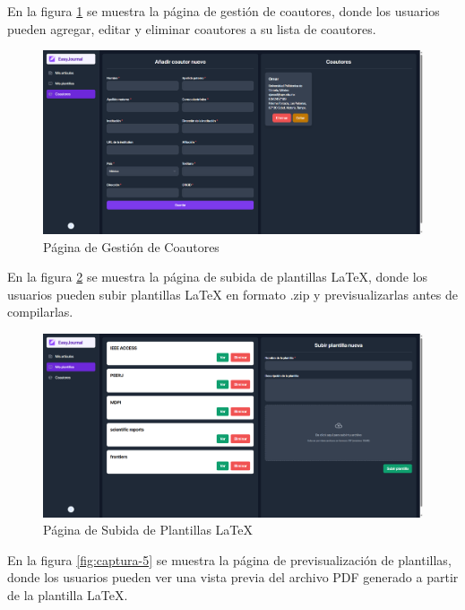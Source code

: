 En la figura \ref{fig:captura-3} se muestra la página de gestión de coautores, donde los usuarios pueden agregar, editar y eliminar coautores a su lista de coautores.

\begin{figure}[H]
    \centering
    \includegraphics[width=1\textwidth]{IMAGENES/captura-3.png}
    \caption{Página de Gestión de Coautores}
    \label{fig:captura-3}
\end{figure}

En la figura \ref{fig:captura-4} se muestra la página de subida de plantillas LaTeX, donde los usuarios pueden subir plantillas LaTeX en formato .zip y previsualizarlas antes de compilarlas.

\begin{figure}[H]
    \centering
    \includegraphics[width=1\textwidth]{IMAGENES/captura-4.png}
    \caption{Página de Subida de Plantillas LaTeX}
    \label{fig:captura-4}
\end{figure}

En la figura \ref{fig:captura-5} se muestra la página de previsualización de plantillas, donde los usuarios pueden ver una vista previa del archivo PDF generado a partir de la plantilla LaTeX.

